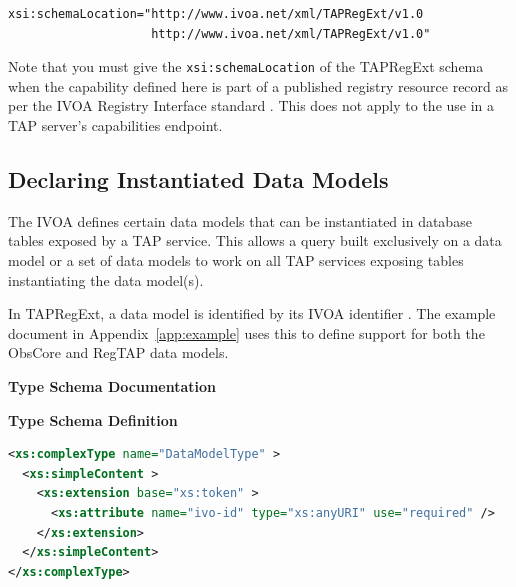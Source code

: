 \documentclass{ivoa}
\begin{document}
\begin{verbatim}
xsi:schemaLocation="http://www.ivoa.net/xml/TAPRegExt/v1.0
                    http://www.ivoa.net/xml/TAPRegExt/v1.0"
\end{verbatim}

Note that you must give the \texttt{xsi:schemaLocation} of
the TAPRegExt schema when the capability defined here is part of a published
registry resource record as per the IVOA Registry Interface standard 
\citep{std:RI1}.  This does not apply to the use
in a TAP server's capabilities endpoint.


\subsection{Declaring Instantiated Data Models}

\label{dms}

The IVOA defines certain data models that can be instantiated in database
tables exposed by a TAP service.  This allows a query built exclusively
on a data model or a set of data models to work on all TAP services exposing
tables instantiating the data model(s).

In TAPRegExt, a data model is identified by its IVOA identifier
\citep{std:VOID}.  The example document in Appendix~\ref{app:example}
uses this to define support for both the ObsCore and RegTAP data models.

\begingroup
      	\renewcommand*\descriptionlabel[1]{%
      	\hbox to 5.5em{\emph{#1}\hfil}}
      	\vspace{2ex}\noindent\textbf{ Type Schema Documentation}


\vspace{1ex}\noindent\textbf{ Type Schema Definition}

\begin{lstlisting}[language=XML,basicstyle=\footnotesize]
<xs:complexType name="DataModelType" >
  <xs:simpleContent >
    <xs:extension base="xs:token" >
      <xs:attribute name="ivo-id" type="xs:anyURI" use="required" />
    </xs:extension>
  </xs:simpleContent>
</xs:complexType>
\end{lstlisting}
\end{document}
